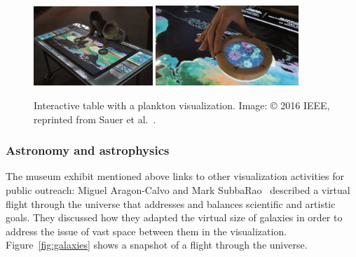 \documentclass[10pt,journal,compsoc]{IEEEtran}
\begin{document}
\begin{figure}
    \begin{center}    
        \includegraphics[width=0.40\textwidth]{museum1.png} %
        \includegraphics[width=0.48\textwidth]{museum2.png}
        \caption{Interactive table with a plankton visualization. Image: \copyright{} 2016 IEEE, reprinted from Sauer et al.~\cite{Sauer2016}. 
  \label{fig:museum}}        
    \end{center}
\end{figure}



\subsubsection*{Astronomy and astrophysics}


The museum exhibit mentioned above links to other visualization activities for public outreach: 
Miguel Aragon-Calvo and Mark SubbaRao~\cite{Aragon-Calvo2015} described a virtual flight through the universe that addresses and balances scientific and artistic goals. They discussed how they adapted the virtual size of galaxies in order to address the issue of vast space between them in the visualization. Figure~\ref{fig:galaxies} shows a snapshot of a flight through the universe.
\end{document}
